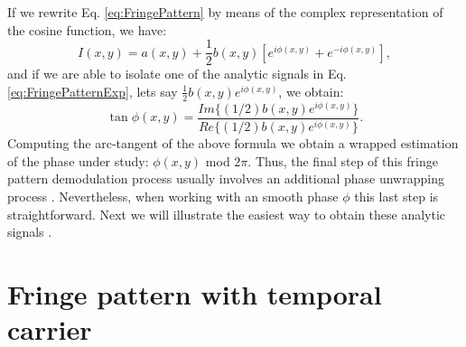 If we rewrite Eq. \eqref{eq:FringePattern} by means of the complex representation of
the cosine function, we have:
\begin{equation}\label{eq:FringePatternExp}
 I(x,y)=a(x,y)+ \frac{1}{2} b(x,y)[e^{i \phi(x,y)} + e^{-i \phi(x,y)}],
\end{equation}
and if we are able to isolate one of the analytic signals in Eq. 
\eqref{eq:FringePatternExp}, lets say $\frac{1}{2} b(x,y)e^{i \phi(x,y)}$, we 
obtain:
\begin{equation}\label{eq:TanPhi}
 \tan \phi(x,y)=\frac{Im\{(1/2)b(x,y)e^{i \phi(x,y)}\}}{Re\{(1/2)b(x,y)
e^{i \phi(x,y)}\}}.
\end{equation}
Computing the arc-tangent of the above formula we obtain a wrapped estimation of
the phase under study: $\phi(x,y)$ mod $2\pi$. Thus, the final step of this fringe
pattern demodulation process usually involves an additional phase unwrapping 
process \cite{Itoh:82,Huntley:89,Ghiglia:94,Quiroga:94}. Nevertheless, when 
working with an smooth phase $\phi$ this last step is 
straightforward. Next we will illustrate the easiest way to obtain these analytic 
signals \cite{ServinA:10,Crane:69,Hays:71}.

\section{Fringe pattern with temporal carrier}


